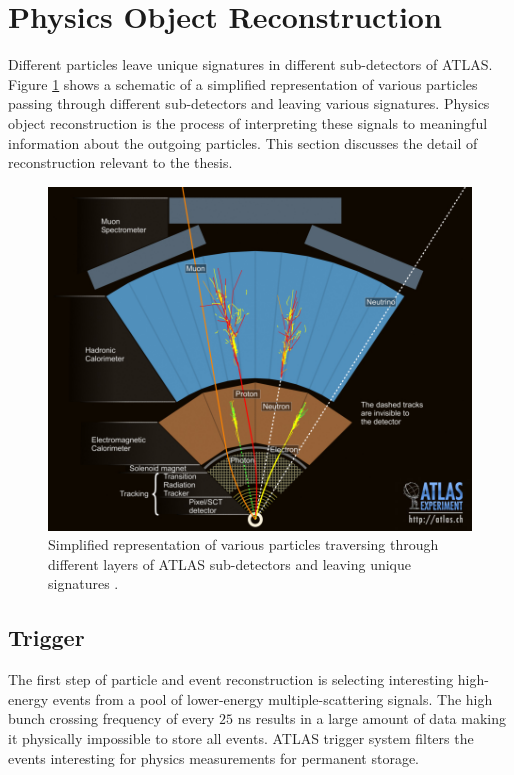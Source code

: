 \section{ Physics Object Reconstruction} 
\label{sec:ParticleReconstruction}
Different particles leave unique signatures in different sub-detectors of ATLAS. Figure \ref{fig:ATLASTransverse} shows a schematic of a simplified representation of various particles passing through different sub-detectors and leaving various signatures. Physics object reconstruction is the process of interpreting these signals to meaningful information about the outgoing particles. This section discusses the detail of reconstruction relevant to the thesis. 

\begin{figure}
    \centering
    \includegraphics[width=.98\linewidth]{figures/LHC/ATLAS_Transverse.jpg}
    \caption{ Simplified representation of various particles traversing through different layers of ATLAS sub-detectors and leaving unique signatures \cite{ATLASTransverse}.\label{fig:ATLASTransverse}}
\end{figure}

\subsection{Trigger}
\label{subsec:TriggerATLAS}
The first step of particle and event reconstruction is selecting interesting high-energy events from a pool of lower-energy multiple-scattering signals. The high bunch crossing frequency of every $25$ ns results in a large amount of data making it physically impossible to store all events. ATLAS trigger system filters the events interesting for physics measurements for permanent storage. 

